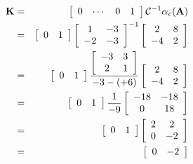 \begin{eqnarray*}
	{\bf{K}} & = & \left[ {\begin{array}{*{20}c}
	   0 &  \cdots  & 0 & 1  \\
	\end{array}} \right]\mathcal{C}^{ - 1} \alpha _c ({\bf{A}}) \\
	& = & \left[ {\begin{array}{*{20}c}
	   0 & 1  \\
	\end{array}} \right]\left[ {\begin{array}{*{20}c}
	   1 & { - 3}  \\
	   { - 2} & { - 3}  \\
	\end{array}} \right]^{ - 1} \left[ {\begin{array}{*{20}c}
	   2 & 8  \\
	   { - 4} & 2  \\
	\end{array}} \right] \\
	& = & \left[ {\begin{array}{*{20}c}
	   0 & 1  \\
	\end{array}} \right]\frac{\left[ {\begin{array}{*{20}c}
	   { -3 } & { 3 }  \\
	   { 2 } & { 1 }  \\
	\end{array}} \right]}{-3-(+6)} \left[ {\begin{array}{*{20}c}
	   2 & 8  \\
	   { - 4} & 2  \\
	\end{array}} \right] \\
	& = & \left[ {\begin{array}{*{20}c}
	   0 & 1  \\
	\end{array}} \right]\frac{1}{-9}\left[ \begin{array}{*{20}c}
	   { -18 } & { -18 }  \\
	   { 0 } & { 18 }  \\
	\end{array} \right] \\
	& = & \left[ {\begin{array}{*{20}c}
	   0 & 1  \\
	\end{array}} \right]\left[ \begin{array}{*{20}c}
	   { 2 } & { 2 }  \\
	   { 0 } & { -2 }  \\
	\end{array} \right] \\
	& = & \left[ {\begin{array}{*{20}c}
	   0 & -2  \\
	\end{array}} \right]
\end{eqnarray*}

